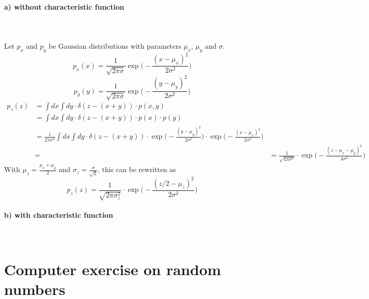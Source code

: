 \documentclass[11 pt]{article}
\begin{document}
        \paragraph{a) without characteristic function} \ \\ 
        \\
        Let $p_x$ and $p_y$ be Gaussian distributions with 
        parameters $\mu_x$, $\mu_y$ and $\sigma$.
        \begin{equation}
            p_x(x)=\frac{1}{\sqrt{2\pi\sigma}}
            \exp\bigg(-\frac{(x-\mu_x)^2}{2\sigma^2}\bigg)
        \end{equation}
        \begin{equation}
            p_y(y)=\frac{1}{\sqrt{2\pi\sigma}}
            \exp\bigg(-\frac{(y-\mu_y)^2}{2\sigma^2}\bigg)
        \end{equation}
        \begin{align}
            p_z(z)
            &=\int dx\int dy\cdot\delta(z-(x+y))\cdot p(x,y) \\
            &=\int dx\int dy\cdot\delta(z-(x+y))\cdot p(x)\cdot p(y) \\
            &=\frac{1}{2\pi\sigma^2}\int dx\int dy\cdot
            \delta(z-(x+y))\cdot
            \exp\bigg(-\frac{(y-\mu_y)^2}{2\sigma^2}\bigg)\cdot
            \exp\bigg(-\frac{(x-\mu_x)^2}{2\sigma^2}\bigg) \\
            &=
            &=\frac{1}{\sqrt{4\pi\sigma^2}}\cdot
            \exp\bigg(-\frac{(z-\mu_x-\mu_y)^2}{4\sigma^2}\bigg)
        \end{align}
        With $\mu_z=\frac{\mu_x+\mu_y}{2}$
        and $\sigma_z=\frac{\sigma}{\sqrt{2}}$, this can be 
        rewritten as
        \begin{equation}
            p_z(z)
            =\frac{1}{\sqrt{2\pi\sigma_z^2}}\cdot
            \exp\bigg(-\frac{(z/2-\mu_z)^2}{2\sigma^2}\bigg)
        \end{equation}

        \paragraph{b) with characteristic function} \ \\


    \section{Computer exercise on random numbers}
\end{document}
